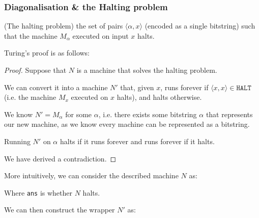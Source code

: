 \message{ !name(AlgComplexAllFlashCards.tex)}\documentclass{beamer}
\begin{document}
\begin{frame}[allowframebreaks]
  \frametitle{Diagonalisation \& the Halting problem}

  \begin{problem}(The halting problem)
    the set of pairs $\langle \alpha,x \rangle $ (encoded as a single bitstring) such that the machine $M_{\alpha}$ executed on input $x$ halts.
  \end{problem}

  \framebreak
  Turing's proof is as follows:

    \begin{proof}
    Suppose that $N$ is a machine that solves the halting problem.

    We can convert it into a machine $N'$ that, given $x$, runs forever if $\langle x,x \rangle \in \texttt{HALT} $ (i.e. the machine $M_{x}$ executed on $x$ halts), and halts otherwise.

    We know $N' = M_{\alpha }$ for some $\alpha $, i.e. there exists some bitstring $\alpha $ that represents our new machine, as we know every machine can be represented as a bitstring.

    Running $N'$ on $\alpha$ halts if it runs forever and runs forever if it halts.

    We have derived a contradiction.


  \end{proof}

  \framebreak

  More intuitively, we can consider the described machine $N$ as:
    \begin{center}
  \end{center}

  Where  \texttt{ans} is whether $N$ halts.

  We can then construct the wrapper $N'$ as:



\end{frame}
\end{document}
